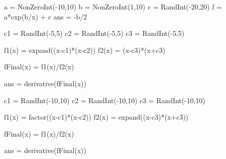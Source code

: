 \begin{sagesilent}
a = NonZeroInt(-10,10)
b = NonZeroInt(1,10)
c = RandInt(-20,20)
f = a*exp(b/x) + c
ans = -b/2
\end{sagesilent}



\begin{sagesilent}

c1 = RandInt(-5,5)
c2 = RandInt(-5,5)
c3 = RandInt(-5,5)

f1(x) = expand((x-c1)*(x-c2))
f2(x) = (x-c3)*(x+c3)

fFinal(x) = f1(x)/f2(x)

ans = derivative(fFinal(x))

\end{sagesilent}



\begin{sagesilent}

c1 = RandInt(-10,10)
c2 = RandInt(-10,10)
c3 = RandInt(-10,10)

f1(x) = factor((x-c1)*(x-c2))
f2(x) = expand((x-c3)*(x+c3))

fFinal(x) = f1(x)/f2(x)

ans = derivative(fFinal(x))

\end{sagesilent}

